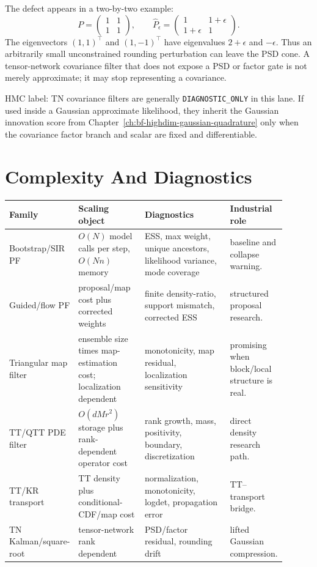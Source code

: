 The defect appears in a two-by-two example:
\[
  P=\begin{pmatrix}1&1\\1&1\end{pmatrix},\qquad
  \widehat P_\epsilon=
  \begin{pmatrix}1&1+\epsilon\\1+\epsilon&1\end{pmatrix}.
\]
The eigenvectors \((1,1)^\top\) and \((1,-1)^\top\) have eigenvalues
\(2+\epsilon\) and \(-\epsilon\).  Thus an arbitrarily small unconstrained
rounding perturbation can leave the PSD cone.  A tensor-network covariance
filter that does not expose a PSD or factor gate is not merely approximate; it
may stop representing a covariance.

HMC label: TN covariance filters are generally \texttt{DIAGNOSTIC\_ONLY} in this lane.
If used inside a Gaussian approximate likelihood, they inherit the Gaussian
innovation score from Chapter~\ref{ch:bf-highdim-gaussian-quadrature} only when
the covariance factor branch and scalar are fixed and differentiable.

\section{Complexity And Diagnostics}
\label{sec:bf-hd-ptt-complexity}

\begin{longtable}{@{}p{0.18\linewidth}p{0.24\linewidth}p{0.31\linewidth}p{0.17\linewidth}@{}}
\toprule
Family & Scaling object & Diagnostics & Industrial role \\
\midrule
\endhead
Bootstrap/SIR PF & \(O(N)\) model calls per step, \(O(Nn)\) memory & ESS, max
weight, unique ancestors, likelihood variance, mode coverage & baseline and
collapse warning. \\
Guided/flow PF & proposal/map cost plus corrected weights & finite
density-ratio, support mismatch, corrected ESS & structured proposal research. \\
Triangular map filter & ensemble size times map-estimation cost; localization
dependent & monotonicity, map residual, localization sensitivity & promising
when block/local structure is real. \\
TT/QTT PDE filter & \(O(dMr^2)\) storage plus rank-dependent operator cost &
rank growth, mass, positivity, boundary, discretization & direct density
research path. \\
TT/KR transport & TT density plus conditional-CDF/map cost & normalization,
monotonicity, logdet, propagation error & TT--transport bridge. \\
TN Kalman/square-root & tensor-network rank dependent & PSD/factor residual,
rounding drift & lifted Gaussian compression. \\
\bottomrule
\end{longtable}

